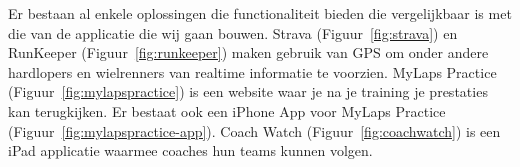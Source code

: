 \newcommand{\vergelijkbaresystemen}{}
\label{sec:vergelijkbare-systemen}

Er bestaan al enkele oplossingen die functionaliteit bieden die vergelijkbaar is met die van de applicatie die wij gaan bouwen. Strava (Figuur~\ref{fig:strava}) en RunKeeper (Figuur~\ref{fig:runkeeper}) maken gebruik van GPS om onder andere hardlopers en wielrenners van realtime informatie te voorzien. MyLaps Practice (Figuur~\ref{fig:mylapspractice}) is een website waar je na je training je prestaties kan terugkijken. Er bestaat ook een iPhone App voor MyLaps Practice (Figuur~\ref{fig:mylapspractice-app}). Coach Watch (Figuur~\ref{fig:coachwatch}) is een iPad applicatie waarmee coaches hun teams kunnen volgen.

\begin{figure}[ht]
\centering
{}


\end{figure}
